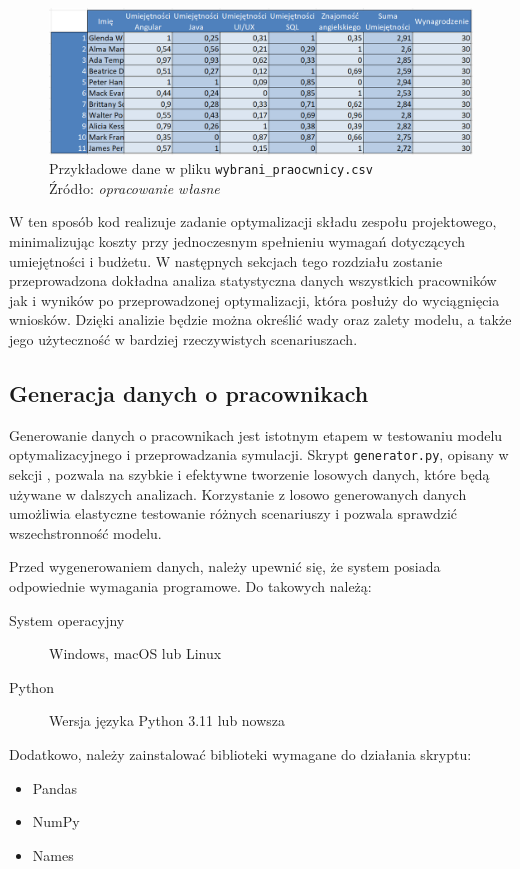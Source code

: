 \begin{description}
            \begin{figure}[H]
                \centering
                \includegraphics[width=\linewidth]{chapters/Images/wybrani_pracownicy_przyklad_csv.png}
                \cprotect\caption{Przykładowe dane w pliku \verb|wybrani_praocwnicy.csv|\\ Źródło:\textit{ opracowanie własne}}
            \end{figure}
    \end{description}
    
    \par W ten sposób kod realizuje zadanie optymalizacji składu zespołu projektowego, minimalizując koszty przy jednoczesnym spełnieniu wymagań dotyczących umiejętności i budżetu. W następnych sekcjach tego rozdziału zostanie przeprowadzona dokładna analiza statystyczna danych wszystkich pracowników jak i wyników po przeprowadzonej optymalizacji, która posłuży do wyciągnięcia wniosków. Dzięki analizie będzie można określić wady oraz zalety modelu, a także jego użyteczność w bardziej rzeczywistych scenariuszach.

    \subsection{Generacja danych o pracownikach}\label{sec:generacja_danych}
    \par Generowanie danych o pracownikach jest istotnym etapem w testowaniu modelu optymalizacyjnego i przeprowadzania symulacji. Skrypt \verb|generator.py|, opisany w sekcji , pozwala na szybkie i efektywne tworzenie losowych danych, które będą używane w dalszych analizach. Korzystanie z losowo generowanych danych umożliwia elastyczne testowanie różnych scenariuszy i pozwala sprawdzić wszechstronność modelu.
    
    \par Przed wygenerowaniem danych, należy upewnić się, że system posiada odpowiednie wymagania programowe. Do takowych należą:
    \begin{description}
        \item[System operacyjny] Windows, macOS lub Linux
        \item[Python] Wersja języka Python 3.11 lub nowsza 
    \end{description}
    Dodatkowo, należy zainstalować biblioteki wymagane do działania skryptu:
    \begin{itemize}
        \item Pandas
        \item NumPy
        \item Names
    \end{itemize}
    
